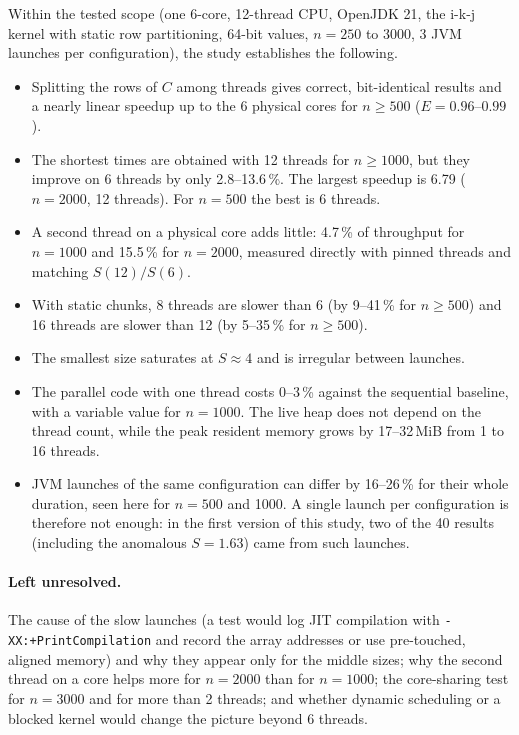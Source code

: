 \documentclass[11pt,a4paper]{article}
\newcommand{\code}[1]{\texttt{#1}}
\begin{document}
Within the tested scope (one 6-core, 12-thread CPU, OpenJDK 21, the i-k-j kernel with static row partitioning, 64-bit values, $n = 250$ to $3000$, 3 JVM launches per configuration), the study establishes the following.
\begin{itemize}
  \item Splitting the rows of $C$ among threads gives correct, bit-identical results and a nearly linear speedup up to the 6 physical cores for $n \ge 500$ ($E = 0.96$--$0.99$).
  \item The shortest times are obtained with 12 threads for $n \ge 1000$, but they improve on 6 threads by only 2.8--13.6\,\%. The largest speedup is 6.79 ($n = 2000$, 12 threads). For $n = 500$ the best is 6 threads.
  \item A second thread on a physical core adds little: 4.7\,\% of throughput for $n = 1000$ and 15.5\,\% for $n = 2000$, measured directly with pinned threads and matching $S(12)/S(6)$.
  \item With static chunks, 8 threads are slower than 6 (by 9--41\,\% for $n \ge 500$) and 16 threads are slower than 12 (by 5--35\,\% for $n \ge 500$).
  \item The smallest size saturates at $S \approx 4$ and is irregular between launches.
  \item The parallel code with one thread costs 0--3\,\% against the sequential baseline, with a variable value for $n = 1000$. The live heap does not depend on the thread count, while the peak resident memory grows by 17--32\,MiB from 1 to 16 threads.
  \item JVM launches of the same configuration can differ by 16--26\,\% for their whole duration, seen here for $n = 500$ and 1000. A single launch per configuration is therefore not enough: in the first version of this study, two of the 40 results (including the anomalous $S = 1.63$) came from such launches.
\end{itemize}

\paragraph{Left unresolved.} The cause of the slow launches (a test would log JIT compilation with \code{-XX:+PrintCompilation} and record the array addresses or use pre-touched, aligned memory) and why they appear only for the middle sizes; why the second thread on a core helps more for $n = 2000$ than for $n = 1000$; the core-sharing test for $n = 3000$ and for more than 2 threads; and whether dynamic scheduling or a blocked kernel would change the picture beyond 6 threads.
\end{document}
